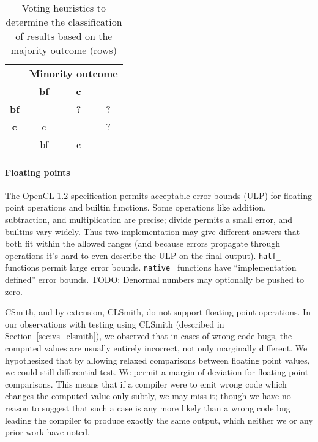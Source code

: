 \begin{table}
	\scriptsize %
	\centering %
	\begin{tabular}{ c|ccc }
		\toprule
		 & \multicolumn{3}{c}{\textbf{Minority outcome}} \\
		 & \textbf{bf} & \textbf{c} & \textbf{\cmark} \\
		\midrule
		\textbf{bf} & \cmark & ? & ? \\
		\textbf{c} & c & \cmark & ? \\
		\textbf{\cmark} & bf & c & \cmark \\
		\bottomrule
	\end{tabular}
	\caption{Voting heuristics to determine the classification of results based on the majority outcome (rows) }
	\label{tab:voting-heuristics}
\end{table}

\paragraph{Floating points} The OpenCL 1.2 specification permits acceptable error bounds (ULP) for floating point operations and builtin functions. Some operations like addition, subtraction, and multiplication are precise; divide permits a small error, and builtins vary widely. Thus two implementation may give different answers that both fit within the allowed ranges (and because errors propagate through operations it's hard to even describe the ULP on the final output). \texttt{half\_} functions permit large error bounds. \texttt{native\_} functions have ``implementation defined'' error bounds. TODO: Denormal numbers may optionally be pushed to zero.

CSmith, and by extension, CLSmith, do not support floating point operations. In our observations with testing using CLSmith (described in Section~\ref{sec:vs_clsmith}), we observed that in cases of wrong-code bugs, the computed values are usually entirely incorrect, not only marginally different. We hypothesized that by allowing relaxed comparisons between floating point values, we could still differential test. We permit a margin of deviation for floating point comparisons. This means that if a compiler were to emit wrong code which changes the computed value only subtly, we may miss it; though we have no reason to suggest that such a case is any more likely than a wrong code bug leading the compiler to produce exactly the same output, which neither we or any prior work have noted.
